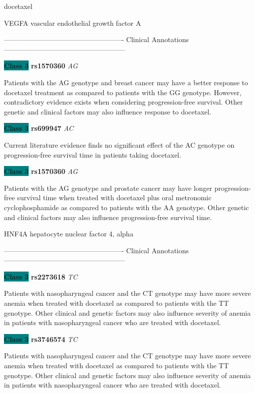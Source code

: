 \documentclass{resume} %
\begin{document}
\begin{rSection}{ docetaxel }
\begin{rSubsection}{ VEGFA }{ vascular endothelial growth factor A }{}{}
\item[] ---------------------------------------------------- Clinical Annotations -----------------------------------------------------\newline
\item \textbf{\colorbox{teal} {Class 3}} \textbf{ rs1570360 } \textit{ AG }
\item[] Patients with the AG genotype and breast cancer may have a better response to docetaxel treatment as compared to patients with the GG genotype. However, contradictory evidence exists when considering progression-free survival. Other genetic and clinical factors may also influence response to docetaxel.\item \textbf{\colorbox{teal} {Class 3}} \textbf{ rs699947 } \textit{ AC }
\item[] Current literature evidence finds no significant effect of the AC genotype on progression-free survival time in patients taking docetaxel.\item \textbf{\colorbox{teal} {Class 3}} \textbf{ rs1570360 } \textit{ AG }
\item[] Patients with the AG genotype and prostate cancer may have longer progression-free survival time when treated with docetaxel plus oral metronomic cyclophosphamide as compared to patients with the AA genotype. Other genetic and clinical factors may also influence progression-free survival time.
\end{rSubsection}\begin{rSubsection}{ HNF4A }{ hepatocyte nuclear factor 4, alpha }{}{}
\item[]

\item[] ---------------------------------------------------- Clinical Annotations -----------------------------------------------------\newline
\item \textbf{\colorbox{teal} {Class 3}} \textbf{ rs2273618 } \textit{ TC }
\item[] Patients with nasopharyngeal cancer and the CT genotype may have more severe anemia when treated with docetaxel as compared to patients with the TT genotype. Other clinical and genetic factors may also influence severity of anemia in patients with nasopharyngeal cancer who are treated with docetaxel. \item \textbf{\colorbox{teal} {Class 3}} \textbf{ rs3746574 } \textit{ TC }
\item[] Patients with nasopharyngeal cancer and the CT genotype may have more severe anemia when treated with docetaxel as compared to patients with the TT genotype. Other clinical and genetic factors may also influence severity of anemia in patients with nasopharyngeal cancer who are treated with docetaxel.


\end{rSubsection}
\end{rSection}
\end{document}
